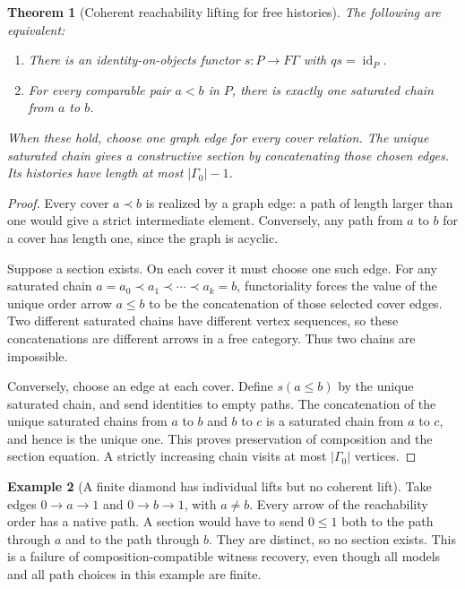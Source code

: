 \documentclass[11pt]{article}
\newtheorem{theorem}{Theorem}[section]
\theoremstyle{definition}
\newtheorem{example}[theorem]{Example}
\theoremstyle{remark}
\newcommand{\id}{\operatorname{id}}
\begin{document}
\begin{theorem}[Coherent reachability lifting for free histories]
\label{path-thm:section}
The following are equivalent:
\begin{enumerate}
\item There is an identity-on-objects functor $s:P\to F\Gamma$ with
      $qs=\id_P$.
\item For every comparable pair $a<b$ in $P$, there is exactly one
      saturated chain from $a$ to $b$.
\end{enumerate}
When these hold, choose one graph edge for every cover relation. The
unique saturated chain gives a constructive section by concatenating
those chosen edges. Its histories have length at most $|\Gamma_0|-1$.
\end{theorem}
\begin{proof}
Every cover $a\prec b$ is realized by a graph edge: a path of length
larger than one would give a strict intermediate element. Conversely,
any path from $a$ to $b$ for a cover has length one, since the graph is
acyclic.

Suppose a section exists. On each cover it must choose one such edge.
For any saturated chain $a=a_0\prec a_1\prec\cdots\prec a_k=b$,
functoriality forces the value of the unique order arrow $a\leq b$ to
be the concatenation of those selected cover edges. Two different
saturated chains have different vertex sequences, so these concatenations
are different arrows in a free category. Thus two chains are impossible.

Conversely, choose an edge at each cover. Define $s(a\leq b)$ by the
unique saturated chain, and send identities to empty paths. The
concatenation of the unique saturated chains from $a$ to $b$ and $b$ to
$c$ is a saturated chain from $a$ to $c$, and hence is the unique one.
This proves preservation of composition and the section equation.
A strictly increasing chain visits at most $|\Gamma_0|$ vertices.
\end{proof}

\begin{example}[A finite diamond has individual lifts but no coherent lift]
Take edges $0\to a\to1$ and $0\to b\to1$, with $a\ne b$.
Every arrow of the reachability order has a native path. A section would
have to send $0\leq1$ both to the path through $a$ and to the path through
$b$. They are distinct, so no section exists. This is a failure of
composition-compatible witness recovery, even though all models and all
path choices in this example are finite.
\end{example}
\end{document}
